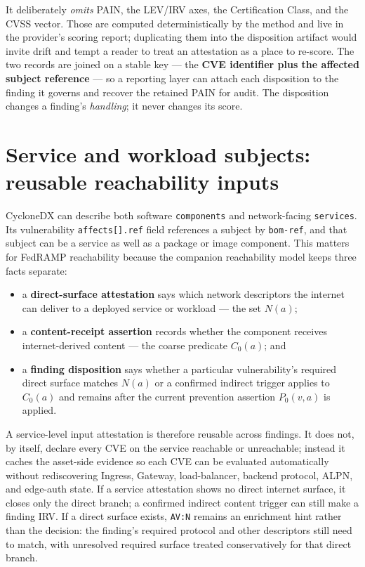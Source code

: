 \documentclass[11pt]{article}
\newcommand{\code}[1]{\texttt{#1}}
\begin{document}
It deliberately \emph{omits} PAIN, the LEV/IRV axes, the Certification Class, and the
CVSS vector. Those are computed deterministically by the method and live in the
provider's scoring report; duplicating them into the disposition artifact would invite
drift and tempt a reader to treat an attestation as a place to re-score. The two
records are joined on a stable key --- the \textbf{CVE identifier plus the affected
subject reference} --- so a reporting layer can attach each disposition to the
finding it governs and recover the retained PAIN for audit. The disposition changes
a finding's \emph{handling}; it never changes its score.


\section{Service and workload subjects: reusable reachability inputs}
CycloneDX can describe both software \code{components} and network-facing \code{services}.
Its vulnerability \code{affects[].ref} field references a subject by \code{bom-ref}, and
that subject can be a service as well as a package or image component. This matters for
FedRAMP reachability because the companion reachability model keeps three facts separate:
\begin{itemize}[leftmargin=1.5em,nosep,topsep=3pt]
\item a \textbf{direct-surface attestation} says which network descriptors the
  internet can deliver to a deployed service or workload --- the set $N(a)$;
\item a \textbf{content-receipt assertion} records whether the component receives
  internet-derived content --- the coarse predicate $C_0(a)$; and
\item a \textbf{finding disposition} says whether a particular vulnerability's required
  direct surface matches $N(a)$ or a confirmed indirect trigger applies to
  $C_0(a)$ and remains after the current prevention assertion $P_0(v,a)$ is
  applied.
\end{itemize}

A service-level input attestation is therefore reusable across findings. It does not,
by itself, declare every CVE on the service reachable or unreachable; instead it caches
the asset-side evidence so each CVE can be evaluated automatically without rediscovering
Ingress, Gateway, load-balancer, backend protocol, ALPN, and edge-auth state. If a service
attestation shows no direct internet surface, it closes only the direct branch; a
confirmed indirect content trigger can still make a finding IRV. If a direct surface
exists, \code{AV:N} remains an enrichment hint rather than the decision: the finding's
required protocol and other descriptors still need to match, with unresolved required
surface treated conservatively for that direct branch.
\end{document}
